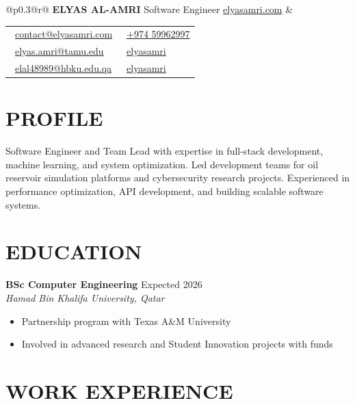 \documentclass[11pt,a4paper]{article}
\begin{document}
\begin{tabular*}{\textwidth}{@{}p{}@{\extracolsep{\fill}}r@{}}
    \textbf{\Large ELYAS AL-AMRI} \newline
    Software Engineer \newline
    \href{https://elyasamri.com}{elyasamri.com} &
    \begin{tabular}[t]{@{}l@{\hspace{2em}}l@{}}
        \faEnvelope\ \href{mailto:contact@elyasamri.com}{contact@elyasamri.com} & \faPhone\ \href{tel:+97459962997}{+974 59962997} \\
        \faEnvelope\ \href{mailto:elyas.amri@tamu.edu}{elyas.amri@tamu.edu} & \faGithub\ \href{https://github.com/elyasamri}{elyasamri} \\
        \faEnvelope\ \href{mailto:elal48989@hbku.edu.qa}{elal48989@hbku.edu.qa} & \faLinkedin\ \href{https://linkedin.com/in/elyasamri}{elyasamri}
    \end{tabular}
\end{tabular*}

\section*{PROFILE}
Software Engineer and Team Lead with expertise in full-stack development, machine learning, and system optimization. Led development teams for oil reservoir simulation platforms and cybersecurity research projects. Experienced in performance optimization, API development, and building scalable software systems.

\section*{EDUCATION}

\textbf{BSc Computer Engineering} \hfill Expected 2026 \\
\textit{Hamad Bin Khalifa University, Qatar}
\begin{itemize}[leftmargin=2em, nosep, label={}]
    \item Partnership program with Texas A\&M University
    \item Involved in advanced research and Student Innovation projects with funds
\end{itemize}


\section*{WORK EXPERIENCE}
\end{document}
